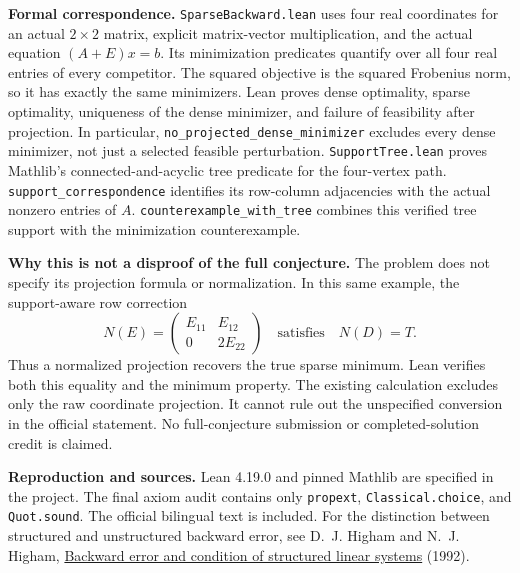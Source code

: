 \documentclass[11pt]{article}
\begin{document}
\textbf{Formal correspondence.} \texttt{SparseBackward.lean} uses four real
coordinates for an actual $2\times2$ matrix, explicit matrix-vector multiplication,
and the actual equation $(A+E)x=b$. Its minimization predicates quantify over
all four real entries of every competitor. The squared objective is the squared
Frobenius norm, so it has exactly the same minimizers. Lean proves dense
optimality, sparse optimality, uniqueness of the dense minimizer, and failure
of feasibility after projection. In particular,
\texttt{no\_projected\_dense\_minimizer} excludes every dense minimizer, not just
a selected feasible perturbation. \texttt{SupportTree.lean} proves Mathlib's connected-and-acyclic tree predicate
for the four-vertex path. \texttt{support\_correspondence} identifies its
row-column adjacencies with the actual nonzero entries of $A$.
\texttt{counterexample\_with\_tree} combines this verified tree support
with the minimization counterexample.

\textbf{Why this is not a disproof of the full conjecture.}
The problem does not specify its projection formula or normalization. In this
same example, the support-aware row correction
\[
 N(E)=\begin{pmatrix}E_{11}&E_{12}\\0&2E_{22}\end{pmatrix}
 \quad\text{satisfies}\quad N(D)=T.
\]
Thus a normalized projection recovers the true sparse minimum. Lean verifies
both this equality and the minimum property.
The existing calculation excludes only the raw coordinate projection.
It cannot rule out the unspecified conversion in the official statement.
No full-conjecture submission or completed-solution credit is claimed.

\textbf{Reproduction and sources.} Lean 4.19.0 and pinned Mathlib are specified
in the project. The final axiom audit contains only \texttt{propext},
\texttt{Classical.choice}, and \texttt{Quot.sound}. The official bilingual text
is included. For the distinction between structured and unstructured backward
error, see D.~J. Higham and N.~J. Higham,
\href{https://eprints.maths.manchester.ac.uk/347/}{Backward error and condition of structured linear systems} (1992).
\end{document}
